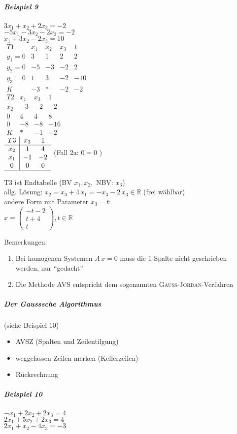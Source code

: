 \documentclass[a4paper]{scrartcl}
\begin{document}
\subparagraph{Beispiel 9}
$3 x_1 + x_2 + 2x_3 = -2$\\
$-5x_1 -3x_2 -2x_3 = -2 $ \\
$x_1 + 3x_2 -2 x_3 = 10 $\\
$\begin{array}{c|cccc}
T1 & x_1 & x_2 & x_3 & 1 \\ \hline
y_1 = 0 & 3 & 1 & 2 & 2 \\
y_2=0 & -5 & -3 & -2 & 2\\
y_3 = 0 & 1 &3 & -2 & -10 \\ \hline
K & -3 & * & -2 & -2 
\end{array}$\\
$\begin{array}{c|ccc}
T2 & x_1 & x_3 & 1\\ \hline
x_2 & -3 & -2 & -2 \\
0 & 4 & 4 & 8 \\
0 & -8 & -8 & -16 \\ \hline
K & * & -1 & -2
\end{array}$\\
$\begin{array}{c|cc}
T3 & x_3 & 1 \\ \hline
x_2 & 1 & 4 \\
x_1 & -1 & -2 \\
0 & 0 & 0 \\ \hline
\end{array}$ (Fall 2a: $0=0$ )

T3 ist Endtabelle (BV $x_1, x_2,$ NBV: $x_3$)\\
allg. Lösung: $x_2 = x_3 +4 \, x_1 = -x_3 -2 \, x_3 \in \mathbb{R}$ (frei wählbar)\\
andere Form mit Parameter $x_3 = t$: \\
$\underline{x} = \begin{pmatrix} -t -2 \\ t+4 \\ t \end{pmatrix}, t \in \mathbb{R}$

Bemerkungen:
\begin{enumerate}
\item Bei homogenen Systemen $\underline{A} \, \underline{x} = \underline{0}$ muss die 1-Spalte nicht geschrieben werden, nur "`gedacht"'
\item Die Methode AVS entspricht dem sogenannten \textsc{Gauss-Jordan}-Verfahren
\end{enumerate}

\subparagraph{Der Gausssche Algorithmus} (siehe Beispiel 10)
\begin{itemize}
\item AVSZ (Spalten und Zeilentilgung)
\item weggelassen Zeilen merken (Kellerzeilen)
\item Rückrechnung
\end{itemize}
\subparagraph{Beispiel 10}
$-x_1 + 2x_2 + 2x_3 = 4$\\
$2 x_1 + 5x_2 + 2x_3 = 4$\\
$2x_1 + x_2 -4 x_3 = -3$\\
\end{document}
